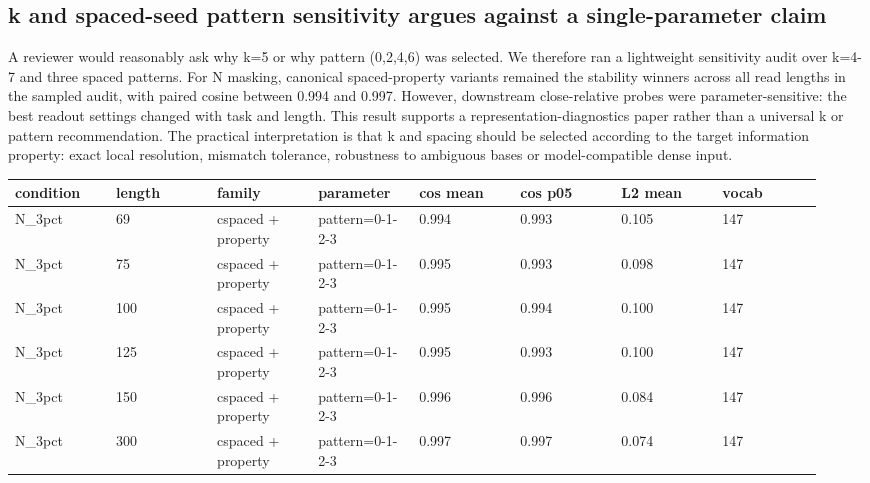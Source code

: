 \documentclass[11pt]{article}
\begin{document}
\subsection*{k and spaced-seed pattern sensitivity argues against a single-parameter claim}

A reviewer would reasonably ask why k=5 or why pattern (0,2,4,6) was selected. We therefore ran a lightweight sensitivity audit over k=4-7 and three spaced patterns. For N masking, canonical spaced-property variants remained the stability winners across all read lengths in the sampled audit, with paired cosine between 0.994 and 0.997. However, downstream close-relative probes were parameter-sensitive: the best readout settings changed with task and length. This result supports a representation-diagnostics paper rather than a universal k or pattern recommendation. The practical interpretation is that k and spacing should be selected according to the target information property: exact local resolution, mismatch tolerance, robustness to ambiguous bases or model-compatible dense input.


\begin{center}
\scriptsize
\begin{adjustbox}{max width=\linewidth}
\begin{tabularx}{\linewidth}{@{}p{0.117\linewidth}p{0.117\linewidth}p{0.117\linewidth}p{0.117\linewidth}p{0.117\linewidth}p{0.117\linewidth}p{0.117\linewidth}p{0.117\linewidth}@{}}
\toprule
\textbf{condition} & \textbf{length} & \textbf{family} & \textbf{parameter} & \textbf{cos mean} & \textbf{cos p05} & \textbf{L2 mean} & \textbf{vocab} \\
\midrule
N\_3pct & 69 & cspaced + property & pattern=0-1-2-3 & 0.994 & 0.993 & 0.105 & 147 \\
N\_3pct & 75 & cspaced + property & pattern=0-1-2-3 & 0.995 & 0.993 & 0.098 & 147 \\
N\_3pct & 100 & cspaced + property & pattern=0-1-2-3 & 0.995 & 0.994 & 0.100 & 147 \\
N\_3pct & 125 & cspaced + property & pattern=0-1-2-3 & 0.995 & 0.993 & 0.100 & 147 \\
N\_3pct & 150 & cspaced + property & pattern=0-1-2-3 & 0.996 & 0.996 & 0.084 & 147 \\
N\_3pct & 300 & cspaced + property & pattern=0-1-2-3 & 0.997 & 0.997 & 0.074 & 147 \\
\bottomrule
\end{tabularx}
\end{adjustbox}
\end{center}
\normalsize
\end{document}
